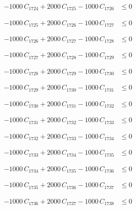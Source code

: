 \documentclass[a4paper,11pt]{article}
\begin{document}
\begin{align}
-1000\,C_{1724} + 2000\,C_{1725} - 1000\,C_{1726} &\leq 0 \nonumber
\end{align}

\begin{align}
-1000\,C_{1725} + 2000\,C_{1726} - 1000\,C_{1727} &\leq 0 \nonumber
\end{align}

\begin{align}
-1000\,C_{1726} + 2000\,C_{1727} - 1000\,C_{1728} &\leq 0 \nonumber
\end{align}

\begin{align}
-1000\,C_{1727} + 2000\,C_{1728} - 1000\,C_{1729} &\leq 0 \nonumber
\end{align}

\begin{align}
-1000\,C_{1728} + 2000\,C_{1729} - 1000\,C_{1730} &\leq 0 \nonumber
\end{align}

\begin{align}
-1000\,C_{1729} + 2000\,C_{1730} - 1000\,C_{1731} &\leq 0 \nonumber
\end{align}

\begin{align}
-1000\,C_{1730} + 2000\,C_{1731} - 1000\,C_{1732} &\leq 0 \nonumber
\end{align}

\begin{align}
-1000\,C_{1731} + 2000\,C_{1732} - 1000\,C_{1733} &\leq 0 \nonumber
\end{align}

\begin{align}
-1000\,C_{1732} + 2000\,C_{1733} - 1000\,C_{1734} &\leq 0 \nonumber
\end{align}

\begin{align}
-1000\,C_{1733} + 2000\,C_{1734} - 1000\,C_{1735} &\leq 0 \nonumber
\end{align}

\begin{align}
-1000\,C_{1734} + 2000\,C_{1735} - 1000\,C_{1736} &\leq 0 \nonumber
\end{align}

\begin{align}
-1000\,C_{1735} + 2000\,C_{1736} - 1000\,C_{1737} &\leq 0 \nonumber
\end{align}

\begin{align}
-1000\,C_{1736} + 2000\,C_{1737} - 1000\,C_{1738} &\leq 0 \nonumber
\end{align}
\end{document}
